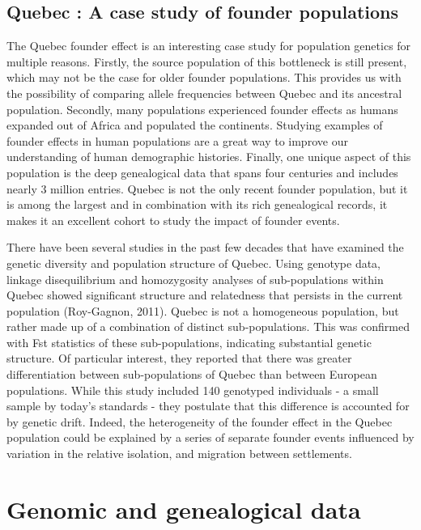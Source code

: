 \documentclass[
11pt, %
oneside, %
english, %
doublespacing, %
headsepline, %
]{MastersDoctoralThesis} %
\begin{document}
\subsection{Quebec : A case study of founder populations}

The Quebec founder effect is an interesting case study for population genetics for multiple reasons.
Firstly, the source population of this bottleneck is still present, which may not be the case for older founder populations. 
This provides us with the possibility of comparing allele frequencies between Quebec and its ancestral population.
Secondly, many populations experienced founder effects as humans expanded out of Africa and populated the continents.
Studying examples of founder effects in human populations are a great way to improve our understanding of human demographic histories.
Finally, one unique aspect of this population is the deep genealogical data that spans four centuries and includes nearly 3 million entries.
Quebec is not the only recent founder population, but it is among the largest and in combination with its rich genealogical records, it makes it an excellent cohort to study the impact of founder events.

There have been several studies in the past few decades that have examined the genetic diversity and population structure of Quebec.
Using genotype data, linkage disequilibrium and homozygosity analyses of sub-populations within Quebec showed significant structure and relatedness that persists in the current population (Roy-Gagnon, 2011).
Quebec is not a homogeneous population, but rather made up of a combination of distinct sub-populations.
This was confirmed with Fst statistics of these sub-populations, indicating substantial genetic structure.
Of particular interest, they reported that there was greater differentiation between sub-populations of Quebec than between European populations.
While this study included 140 genotyped individuals - a small sample by today's standards - they postulate that this difference is accounted for by genetic drift.
Indeed, the heterogeneity of the founder effect in the Quebec population could be explained by a series of separate founder events influenced by variation in the relative isolation, and migration between settlements.

\section{Genomic and genealogical data}
\end{document}
